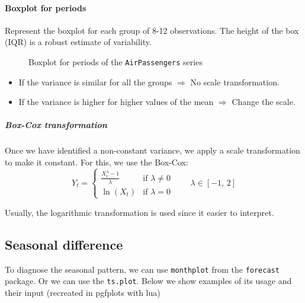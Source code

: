 \paragraph{Boxplot for periods} Represent the boxplot for each group of 8-12
observations. The height of the box (IQR) is a robust estimate of variability.

\begin{figure}[H]
	\caption{Boxplot for periods of the \texttt{AirPassengers} series}
\end{figure}

\begin{itemize}
	\item If the variance is similar for all the groups $\Longrightarrow$ No scale transformation.
	\item If the variance is higher for higher values of the mean $\Longrightarrow$ Change the scale.
\end{itemize}

\subparagraph{Box-Cox transformation}
Once we have identified a non-constant variance, we apply a scale
transformation to make it constant. For this, we use the Box-Cox:
\begin{equation}
	Y_t = \begin{cases}
		\frac{X_t^\lambda - 1}{\lambda} & \text{if } \lambda \neq 0 \\
		\ln(X_t)                        & \text{if } \lambda = 0
	\end{cases} \qquad \lambda \in [-1,\,2]
\end{equation}
\begin{marker}
	Usually, the logarithmic transformation is used since it easier to interpret.
\end{marker}

\subsection{Seasonal difference}
To diagnose the seasonal pattern, we can use \texttt{monthplot}
from the \texttt{forecast} package. Or we can use the \texttt{ts.plot}. Below we show examples of its usage and their input (recreated in pgfplots with lua)

